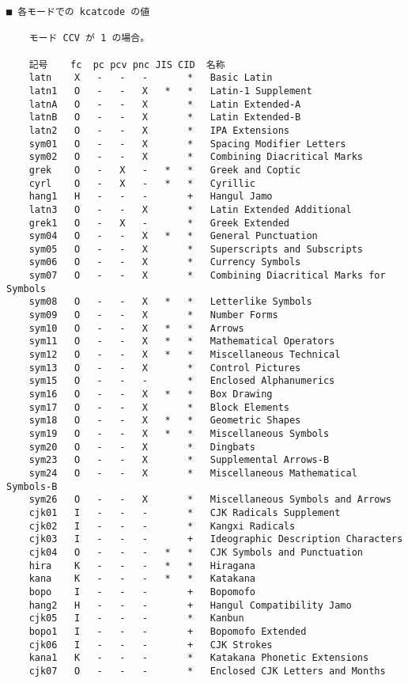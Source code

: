 \documentclass[uplatex,dvipdfmx,a4paper]{jsarticle}
\begin{document}
\begin{verbatim}
■ 各モードでの kcatcode の値

    モード CCV が 1 の場合。

    記号    fc  pc pcv pnc JIS CID  名称
    latn    X   -   -   -       *   Basic Latin
    latn1   O   -   -   X   *   *   Latin-1 Supplement
    latnA   O   -   -   X       *   Latin Extended-A
    latnB   O   -   -   X       *   Latin Extended-B
    latn2   O   -   -   X       *   IPA Extensions
    sym01   O   -   -   X       *   Spacing Modifier Letters
    sym02   O   -   -   X       *   Combining Diacritical Marks
    grek    O   -   X   -   *   *   Greek and Coptic
    cyrl    O   -   X   -   *   *   Cyrillic
    hang1   H   -   -   -       +   Hangul Jamo
    latn3   O   -   -   X       *   Latin Extended Additional
    grek1   O   -   X   -       *   Greek Extended
    sym04   O   -   -   X   *   *   General Punctuation
    sym05   O   -   -   X       *   Superscripts and Subscripts
    sym06   O   -   -   X       *   Currency Symbols
    sym07   O   -   -   X       *   Combining Diacritical Marks for Symbols
    sym08   O   -   -   X   *   *   Letterlike Symbols
    sym09   O   -   -   X       *   Number Forms
    sym10   O   -   -   X   *   *   Arrows
    sym11   O   -   -   X   *   *   Mathematical Operators
    sym12   O   -   -   X   *   *   Miscellaneous Technical
    sym13   O   -   -   X       *   Control Pictures
    sym15   O   -   -   -       *   Enclosed Alphanumerics
    sym16   O   -   -   X   *   *   Box Drawing
    sym17   O   -   -   X       *   Block Elements
    sym18   O   -   -   X   *   *   Geometric Shapes
    sym19   O   -   -   X   *   *   Miscellaneous Symbols
    sym20   O   -   -   X       *   Dingbats
    sym23   O   -   -   X       *   Supplemental Arrows-B
    sym24   O   -   -   X       *   Miscellaneous Mathematical Symbols-B
    sym26   O   -   -   X       *   Miscellaneous Symbols and Arrows
    cjk01   I   -   -   -       *   CJK Radicals Supplement
    cjk02   I   -   -   -       *   Kangxi Radicals
    cjk03   I   -   -   -       +   Ideographic Description Characters
    cjk04   O   -   -   -   *   *   CJK Symbols and Punctuation
    hira    K   -   -   -   *   *   Hiragana
    kana    K   -   -   -   *   *   Katakana
    bopo    I   -   -   -       +   Bopomofo
    hang2   H   -   -   -       +   Hangul Compatibility Jamo
    cjk05   I   -   -   -       *   Kanbun
    bopo1   I   -   -   -       +   Bopomofo Extended
    cjk06   I   -   -   -       +   CJK Strokes
    kana1   K   -   -   -       *   Katakana Phonetic Extensions
    cjk07   O   -   -   -       *   Enclosed CJK Letters and Months

\end{verbatim}
\end{document}
